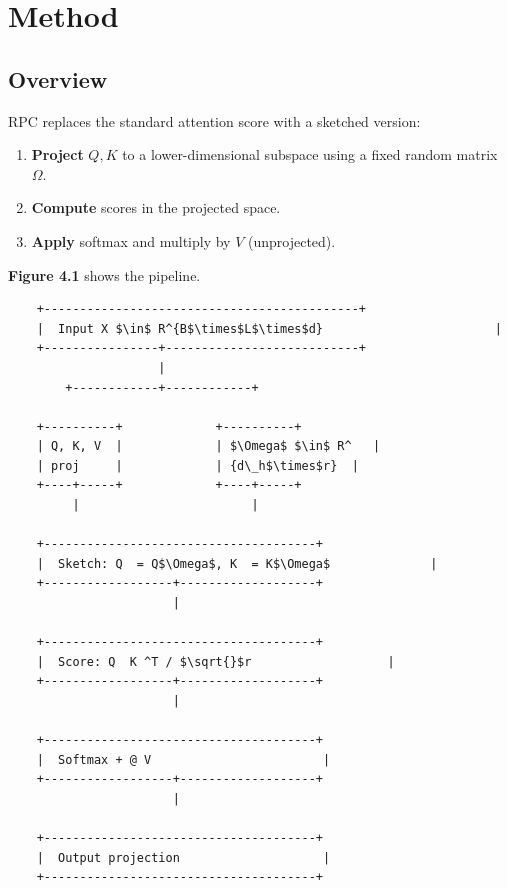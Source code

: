 
\section{Method}

\subsection{Overview}

RPC replaces the standard attention score with a sketched version:

\begin{enumerate}
\item \textbf{Project} $Q, K$ to a lower-dimensional subspace using a fixed random
  matrix $\Omega$.
\item \textbf{Compute} scores in the projected space.
\item \textbf{Apply} softmax and multiply by $V$ (unprojected).

\end{enumerate}
\textbf{Figure 4.1} shows the pipeline.

\begin{lstlisting}
    +--------------------------------------------+
    |  Input X $\in$ R^{B$\times$L$\times$d}                        |
    +----------------+---------------------------+
                     |
        +------------+------------+
                                   
    +----------+             +----------+
    | Q, K, V  |             | $\Omega$ $\in$ R^   |
    | proj     |             | {d\_h$\times$r}  |
    +----+-----+             +----+-----+
         |                        |
                                   
    +--------------------------------------+
    |  Sketch: Q  = Q$\Omega$, K  = K$\Omega$              |
    +------------------+-------------------+
                       |
                        
    +--------------------------------------+
    |  Score: Q  K ^T / $\sqrt{}$r                   |
    +------------------+-------------------+
                       |
                        
    +--------------------------------------+
    |  Softmax + @ V                        |
    +------------------+-------------------+
                       |
                        
    +--------------------------------------+
    |  Output projection                    |
    +--------------------------------------+
\end{lstlisting}

